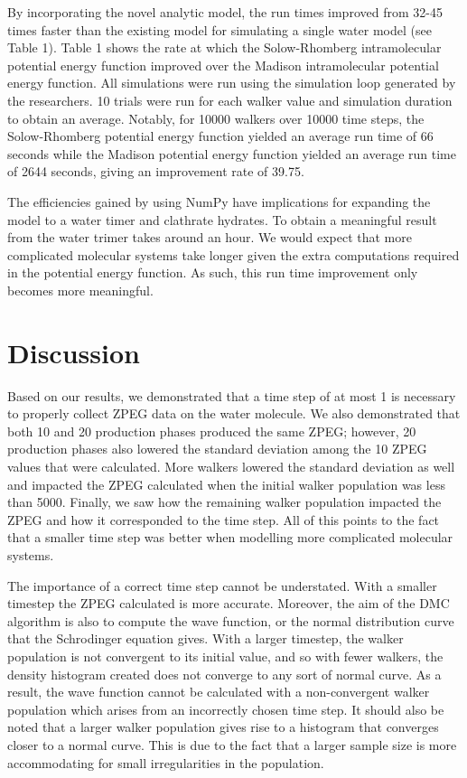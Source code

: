 \documentclass[journal=jacsat,manuscript=article]{achemso}
\begin{document}
By incorporating the novel analytic model, the run times improved from 32-45 times faster than the existing model for simulating a single water model (see Table 1). Table 1 shows the rate at which the Solow-Rhomberg intramolecular potential energy function improved over the Madison intramolecular potential energy function. All simulations were run using the simulation loop generated by the researchers. 10 trials were run for each walker value and simulation duration to obtain an average. Notably, for 10000 walkers over 10000 time steps, the Solow-Rhomberg potential energy function yielded an average run time of 66 seconds while the Madison potential energy function yielded an average run time of 2644 seconds, giving an improvement rate of 39.75.

The efficiencies gained by using NumPy have implications for expanding the model to a water timer and clathrate hydrates. To obtain a meaningful result from the water trimer takes around an hour. We would expect that more complicated molecular systems take longer given the extra computations required in the potential energy function. As such, this run time improvement only becomes more meaningful.

\section{Discussion}
Based on our results, we demonstrated that a time step of at most 1 is necessary to properly collect ZPEG data on the water molecule. We also demonstrated that both 10 and 20 production phases produced the same ZPEG; however, 20 production phases also lowered the standard deviation among the 10 ZPEG values that were calculated. More walkers lowered the standard deviation as well and impacted the ZPEG calculated when the initial walker population was less than 5000. Finally, we saw how the remaining walker population impacted the ZPEG and how it corresponded to the time step. All of this points to the fact that a smaller time step was better when modelling more complicated molecular systems. 

The importance of a correct time step cannot be understated. With a smaller timestep the ZPEG calculated is more accurate. Moreover, the aim of the DMC algorithm is also to compute the wave function, or the normal distribution curve that the Schrodinger equation gives. With a larger timestep, the walker population is not convergent to its initial value, and so with fewer walkers, the density histogram created does not converge to any sort of normal curve. As a result, the wave function cannot be calculated with a non-convergent walker population which arises from an incorrectly chosen time step. It should also be noted that a larger walker population gives rise to a histogram that converges closer to a normal curve. This is due to the fact that a larger sample size is more accommodating for small irregularities in the population. 
\end{document}

